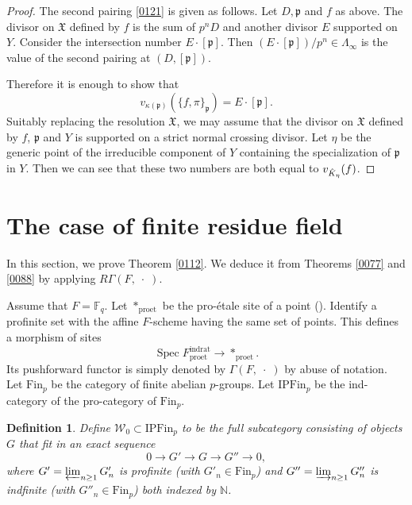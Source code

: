 \documentclass{amsart}
\newtheorem{Def}[Thm]{Definition}
\theoremstyle{remark}
\numberwithin{equation}{section}
\newcommand{\N}{\mathbb{N}}
\newcommand{\F}{\mathbb{F}}
\newcommand{\et}{\mathrm{et}}
\newcommand{\dirlim}{\varinjlim}
\newcommand{\invlim}{\varprojlim}
\newcommand{\rat}{\mathrm{rat}}
\newcommand{\ind}{\mathrm{ind}}
\newcommand{\pro}{\mathrm{pro}}
\newcommand{\Ind}{\mathrm{I}}
\newcommand{\Pro}{\mathrm{P}}
\newcommand{\var}{\;\cdot\;}
\newcommand{\ideal}[1]{\mathfrak{#1}}
\newcommand{\Fin}{\mathrm{Fin}}
\DeclareMathOperator{\Spec}{Spec}
\begin{document}
\begin{proof}
	The second pairing \eqref{0121} is given as follows.
	Let $D, \ideal{p}$ and $f$ as above.
	The divisor on $\mathfrak{X}$ defined by $f$ is the sum of $p^{n} D$
	and another divisor $E$ supported on $Y$.
	Consider the intersection number $E \cdot [\ideal{p}]$.
	Then $(E \cdot [\ideal{p}]) / p^{n} \in \Lambda_{\infty}$ is
	the value of the second pairing at $(D, [\ideal{p}])$.
	
	Therefore it is enough to show that
		\[
				v_{\kappa(\ideal{p})}(\{f, \pi\}_{\ideal{p}})
			=
				E \cdot [\ideal{p}].
		\]
	Suitably replacing the resolution $\mathfrak{X}$,
	we may assume that the divisor on $\mathfrak{X}$ defined by $f$, $\ideal{p}$ and $Y$
	is supported on a strict normal crossing divisor.
	Let $\eta$ be the generic point of the irreducible component of $Y$
	containing the specialization of $\ideal{p}$ in $Y$.
	Then we can see that these two numbers are both equal to $v_{\Hat{K}_{\eta}}(f)$.
\end{proof}


\section{The case of finite residue field}
\label{0119}

In this section, we prove Theorem \ref{0112}.
We deduce it from Theorems \ref{0077} and \ref{0088}
by applying $R \Gamma(F, \var)$.

Assume that $F = \F_{q}$.
Let $\ast_{\pro\et}$ be the pro-\'etale site of a point (\cite[Example 4.1.10]{BS15}).
Identify a profinite set with the affine $F$-scheme
having the same set of points.
This defines a morphism of sites
	\[
			\Spec F^{\ind\rat}_{\pro\et}
		\to
			\ast_{\pro\et}.
	\]
Its pushforward functor is simply denoted by $\Gamma(F, \var)$ by abuse of notation.
Let $\Fin_{p}$ be the category of finite abelian $p$-groups.
Let $\Ind \Pro \Fin_{p}$ be the ind-category of the pro-category of $\Fin_{p}$.

\begin{Def}
	Define $\mathcal{W}_{0} \subset \Ind \Pro \Fin_{p}$ to be the full subcategory consisting of
	objects $G$ that fit in an exact sequence
		\[
				0
			\to
				G'
			\to
				G
			\to
				G''
			\to
				0,
		\]
	where $G' = \invlim_{n \ge 1} G'_{n}$ is profinite (with $G'_{n} \in \Fin_{p}$)
	and $G'' = \dirlim_{n \ge 1} G''_{n}$ is indfinite (with $G''_{n} \in \Fin_{p}$)
	both indexed by $\N$.
\end{Def}
\end{document}
